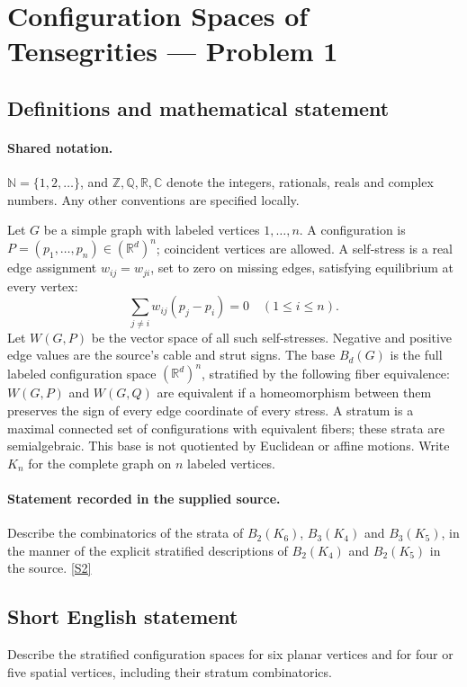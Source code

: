 \documentclass[11pt]{article}
\newcommand{\sref}[2]{\hyperlink{source:#1:#2}{[S#2]}}
\begin{document}
\section{Configuration Spaces of Tensegrities — Problem 1}\label{statement}

\subsection{Definitions and mathematical statement}

\paragraph{Shared notation.}$\mathbb N=\{1,2,\ldots\}$, and $\mathbb Z,\mathbb Q,\mathbb R,\mathbb C$ denote the integers, rationals, reals and complex numbers. Any other conventions are specified locally.


Let $G$ be a simple graph with labeled vertices $1,\ldots,n$. A configuration is $P=(p_1,\ldots,p_n)\in(\mathbb R^d)^n$; coincident vertices are allowed. A self-stress is a real edge assignment $w_{ij}=w_{ji}$, set to zero on missing edges, satisfying equilibrium at every vertex:
\[\sum_{j\ne i}w_{ij}(p_j-p_i)=0\quad(1\leq i\leq n).\]
Let $W(G,P)$ be the vector space of all such self-stresses. Negative and positive edge values are the source’s cable and strut signs. The base $B_d(G)$ is the full labeled configuration space $(\mathbb R^d)^n$, stratified by the following fiber equivalence: $W(G,P)$ and $W(G,Q)$ are equivalent if a homeomorphism between them preserves the sign of every edge coordinate of every stress. A stratum is a maximal connected set of configurations with equivalent fibers; these strata are semialgebraic. This base is not quotiented by Euclidean or affine motions. Write $K_n$ for the complete graph on $n$ labeled vertices.
\paragraph{Statement recorded in the supplied source.}
Describe the combinatorics of the strata of $B_2(K_6)$, $B_3(K_4)$ and $B_3(K_5)$, in the manner of the explicit stratified descriptions of $B_2(K_4)$ and $B_2(K_5)$ in the source. \sref{statement}{2}
\subsection{Short English statement}
Describe the stratified configuration spaces for six planar vertices and for four or five spatial vertices, including their stratum combinatorics.
\end{document}

